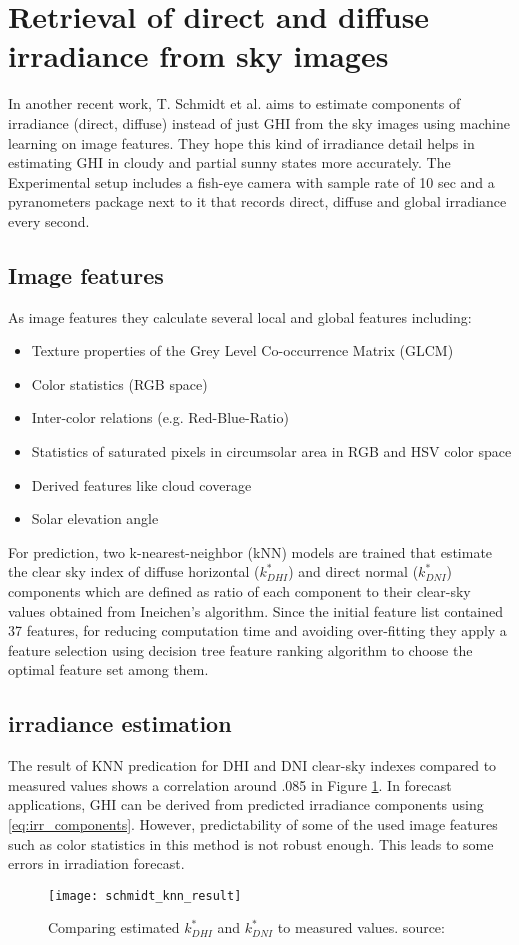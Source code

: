 \section{Retrieval of direct and diffuse irradiance from sky images}
In another recent work, T. Schmidt et al.\cite{tSchmidt15} aims to estimate components of irradiance (direct, diffuse) instead of just GHI from the sky images using machine learning on image features. They hope this kind of irradiance detail helps in estimating GHI in cloudy and partial sunny states more accurately. The Experimental setup includes a fish-eye camera with sample rate of 10 sec and a pyranometers package next to it that records direct, diffuse and global irradiance every second. 
\subsection{Image features}
As image features they calculate several local and global features including: 
\begin{itemize}
\item Texture properties of the Grey Level Co-occurrence Matrix (GLCM)
\item Color statistics (RGB space)
\item Inter-color relations (e.g. Red-Blue-Ratio)
\item Statistics of saturated pixels in circumsolar area in RGB and HSV color space
\item Derived features like cloud coverage
\item Solar elevation angle
\end{itemize}
For prediction, two k-nearest-neighbor (kNN) models are trained that estimate the clear sky index of diffuse horizontal ($k^{*}_{DHI}$) and direct normal ($k^{*}_{DNI}$) components which are defined as ratio of each component to their clear-sky values obtained from Ineichen's algorithm\cite{Ineichen}.
Since the initial feature list contained 37 features, for reducing computation time and avoiding over-fitting they apply a feature selection using decision tree feature ranking algorithm to choose the optimal feature set among them. 
\subsection{irradiance estimation}
The result of KNN predication for DHI and DNI clear-sky indexes compared to measured values shows a correlation around .085 in Figure \ref{fig:knn_result_Schmidt}. In forecast applications, GHI can be derived from predicted irradiance components using \ref{eq:irr_components}. However, predictability of some of the used image features such as color statistics in this method is not robust enough. This leads to some errors in irradiation forecast.

\begin{figure}[h]
\caption{Comparing estimated $k^{*}_{DHI}$ and $k^{*}_{DNI}$ to measured values. source:\cite{tSchmidt15}}
\label{fig:knn_result_Schmidt}
\texttt{[image: schmidt\_knn\_result]}
\centering
\end{figure} 

